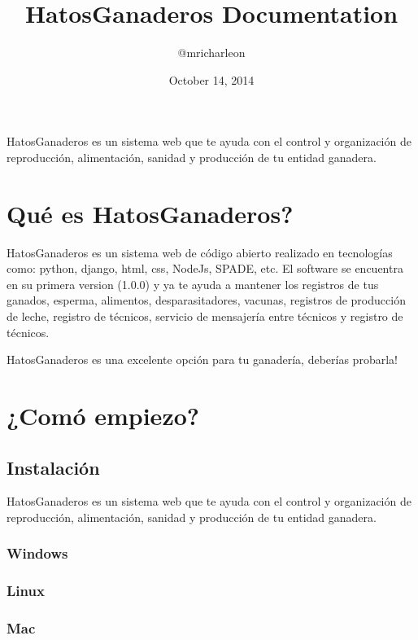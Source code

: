 \documentclass[letterpaper,10pt,english]{sphinxmanual}
\title{HatosGanaderos Documentation}
\date{October 14, 2014}
\author{@mricharleon}
\begin{document}
\maketitle
\tableofcontents
{}\label{index::doc}


HatosGanaderos es un sistema web que te ayuda con el control y organización de reproducción, alimentación, sanidad y producción de tu entidad ganadera.


\chapter{Qué es HatosGanaderos?}
\label{index:welcome-to-hatosganaderos-s-documentation}\label{index:que-es-hatosganaderos}
HatosGanaderos es un sistema web de código abierto realizado en tecnologías como: python, django, html, css, NodeJs, SPADE, etc. El software se encuentra en su primera version (1.0.0) y ya te ayuda a mantener los registros de tus ganados, esperma, alimentos, desparasitadores, vacunas, registros de producción de leche, registro de técnicos, servicio de mensajería entre técnicos y registro de técnicos.

HatosGanaderos es una excelente opción para tu ganadería, deberías probarla!


\chapter{¿Comó empiezo?}
\label{index:como-empiezo}

\section{Instalación}
\label{Instalaci_xf3n:instalacion}\label{Instalaci_xf3n::doc}
HatosGanaderos es un sistema web que te ayuda con el control y organización de reproducción, alimentación, sanidad y producción de tu entidad ganadera.


\subsection{Windows}
\label{Instalaci_xf3n:windows}

\subsection{Linux}
\label{Instalaci_xf3n:linux}

\subsection{Mac}
\label{Instalaci_xf3n:mac}
\end{document}
